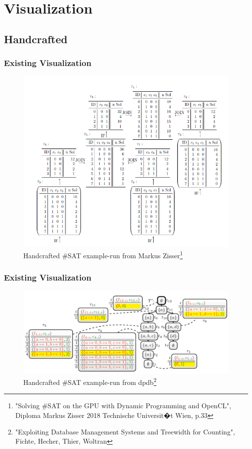 \documentclass[c,8pt,xcolor...,x11names]{beamer}
\begin{document}
\section{Visualization}
\subsection{Handcrafted}
\begin{frame}
	\frametitle{Existing Visualization}
	\begin{figure}
		\centering
		\includegraphics[width=0.6\linewidth]{images/DualDA43.png}
		\caption{Handcrafted \#SAT example-run from Markus Zisser\footnote{"Solving \#SAT on the GPU with Dynamic Programming and OpenCL",\\ Diploma Markus Zisser 2018 Technische Universit�t Wien, p.33}}
		\label{fig:dualda43}
	\end{figure}

\end{frame}
\begin{frame}
	\frametitle{Existing Visualization}
	\begin{figure}
		\centering
		\includegraphics[width=\linewidth]{images/dpdbVisuSat.png}
		\caption{Handcrafted \#SAT example-run from dpdb\footnote{"Exploiting Database Management Systems and Treewidth for Counting",\\ Fichte, Hecher, Thier, Woltran} }
		\label{fig:dpdbVisuSat}
	\end{figure}


\end{frame}
\end{document}
